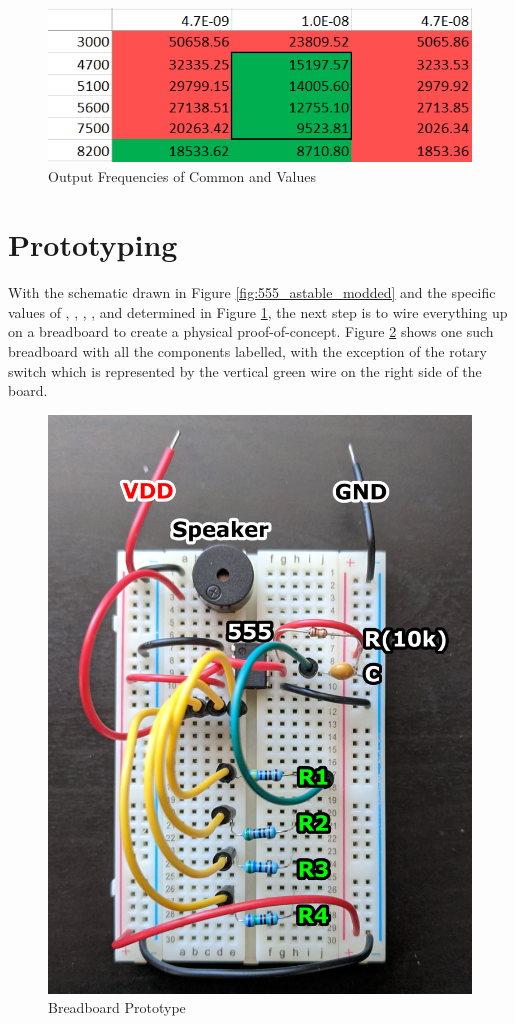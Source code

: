 \begin{figure}[h]
    \centering
    \caption{Output Frequencies of Common  and  Values}
    \label{fig:freq-selection-r}
    \includegraphics[width=0.8\linewidth]{Figures/6 PCB Design/freq_selection_r.png}
\end{figure}


\newpage
\section{Prototyping}
\label{sec:prototype}
With the schematic drawn in Figure \ref{fig:555_astable_modded} and the specific values of , , , , and  determined in Figure \ref{fig:freq-selection-r}, the next step is to wire everything up on a breadboard to create a physical proof-of-concept. Figure \ref{fig:breadboard} shows one such breadboard with all the components labelled, with the exception of the rotary switch which is represented by the vertical green wire on the right side of the board.

\begin{figure}[h]
    \centering
    \caption{Breadboard Prototype}
    \label{fig:breadboard}
    \includegraphics[width=.8\linewidth]{Figures/6 PCB Design/breadboard.png}
\end{figure}

